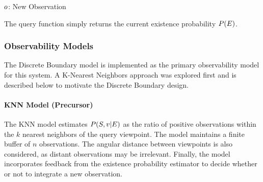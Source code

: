 \begin{singlespace}
    \begin{algorithm}[H]
        \caption[VBEE Update]{VBEE Update: $\vbee.\update{\observation}$}
        \label{alg:vbee_update}
        \begin{algorithmic}
            \Require $o$: New Observation



        \end{algorithmic}
    \end{algorithm}
\end{singlespace}

The query function simply returns the current existence probability $P(E)$.
\subsubsection{Observability Models}
\label{sec:observability_models}

The Discrete Boundary model is implemented as the primary observability model for this system. A K-Nearest Neighbors approach was explored first and is described below to motivate the Discrete Boundary design.

\paragraph{KNN Model (Precursor)}

The KNN model estimates $P(S,v|E)$ as the ratio of positive observations within the $k$ nearest neighbors of the query viewpoint. The model maintains a finite buffer of $n$ observations. The angular distance between viewpoints is also considered, as distant observations may be irrelevant. Finally, the model incorporates feedback from the existence probability estimator to decide whether or not to integrate a new observation.

